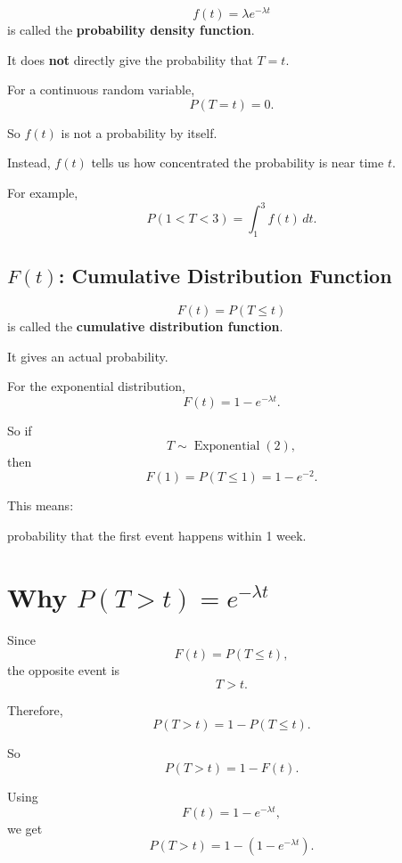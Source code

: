 \documentclass[12pt]{article}
\begin{document}
\[
f(t)=\lambda e^{-\lambda t}
\]
is called the \textbf{probability density function}.

It does \textbf{not} directly give the probability that \(T=t\).

For a continuous random variable,
\[
P(T=t)=0.
\]

So \(f(t)\) is not a probability by itself.

Instead, \(f(t)\) tells us how concentrated the probability is near time \(t\).

\begin{center}
\end{center}

For example,
\[
P(1<T<3)=\int_1^3 f(t)\,dt.
\]

\subsection*{\(F(t)\): Cumulative Distribution Function}

\[
F(t)=P(T\leq t)
\]
is called the \textbf{cumulative distribution function}.

It gives an actual probability.

\begin{center}
\end{center}

For the exponential distribution,
\[
F(t)=1-e^{-\lambda t}.
\]

So if
\[
T\sim \operatorname{Exponential}(2),
\]
then
\[
F(1)=P(T\leq 1)=1-e^{-2}.
\]

This means:

\begin{center}
probability that the first event happens within 1 week.
\end{center}

\section{Why \(P(T>t)=e^{-\lambda t}\)}

Since
\[
F(t)=P(T\leq t),
\]
the opposite event is
\[
T>t.
\]

Therefore,
\[
P(T>t)=1-P(T\leq t).
\]

So
\[
P(T>t)=1-F(t).
\]

Using
\[
F(t)=1-e^{-\lambda t},
\]
we get
\[
P(T>t)=1-\left(1-e^{-\lambda t}\right).
\]
\end{document}
